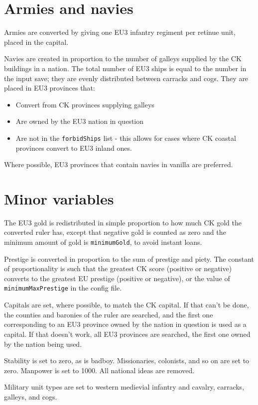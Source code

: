 \documentclass[12pt,ebook,oneside]{book}
\begin{document}
\section{Armies and navies}

Armies are converted by giving one EU3 infantry regiment per retinue
unit, placed in the capital. 

Navies are created in proportion to the number of galleys supplied by
the CK buildings in a nation. The total number of EU3 ships is equal
to the number in the input save; they are evenly distributed
between carracks and cogs. They are placed in EU3 provinces that:
\begin{itemize}
\item Convert from CK provinces supplying galleys
\item Are owned by the EU3 nation in question
\item Are not in the \verb|forbidShips| list - this allows for cases
  where CK coastal provinces convert to EU3 inland ones.
\end{itemize}
Where possible, EU3 provinces that contain navies in vanilla are
preferred. 

\section{Minor variables}

The EU3 gold is redistributed in simple proportion to
how much CK gold the converted ruler has, except that 
negative gold is counted as zero and the minimum amount
of gold is \verb|minimumGold|, to avoid instant loans. 

Prestige is converted in proportion to the sum of prestige and
piety. The constant of proportionality is such that the greatest
CK score (positive or negative) converts to the greatest EU prestige
(positive or negative), or the value of \verb|minimumMaxPrestige| in
the config file. 

Capitals are set, where possible, to match the CK capital. If that
can't be done, the counties and baronies of the ruler are searched,
and the first one corresponding to an EU3 province owned by the nation
in question is used as a capital. If that doesn't work, all EU3
provinces are searched, the first one owned by the nation being used. 

Stability is set to zero, as is badboy. Missionaries, colonists, and
so on are set to zero. Manpower is set to 1000. All national ideas are
removed. 

Military unit types are set to western medievial infantry and cavalry,
carracks, galleys, and cogs. 
\end{document}
